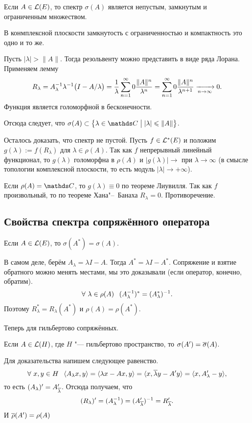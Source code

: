 \begin{Sl}
  Если $A\in \mathcal L(E)$, то спектр $\sigma(A)$ является непустым, замкнутым и ограниченным множеством.
\end{Sl}
В конмплексной плоскости замкнутость с ограниченностью и компактность это одно и то же.
\begin{Proof}
 Пусть $|\lambda|>\|A\|$. Тогда резольвенту можно представить в виде ряда Лорана. Применяем лемму
\[
  R_\lambda = A_\lambda^{-1}\lambda^{-1}\big(I-A/\lambda\big) = \frac1\lambda \sum\limits_{{n}={1}}^\infty0\frac{\|A\|^n}{\lambda^n} = 
  \sum\limits_{{n}={1}}^\infty0\frac{\|A\|^n}{\lambda^{n+1}}\xrightarrow[n\rightarrow\infty]{}0.
\]
Функция является голоморфной в бесконечности.

Отсюда следует, что $\sigma(A)\subset \big\{\lambda\in \C\bigm| |\lambda|\le \|A\|\big\}$.

Осталось доказать, что спектр не пустой. Пусть $f\in\mathcal L^*(E)$ и положим $g(\lambda):=f(R_\lambda)$ для $\lambda\in \rho(A)$. Так как $f$ непрерывный линейный функционал, то $g(\lambda)$ голоморфна в $\rho(A)$ и $\big|g(\lambda)\big|\to$ при $\lambda\to\infty$ (в смысле топологии комплексной плоскости, то есть модуль $|\lambda|\to+\infty$).

Если $\rho(A) = \C$, то $g(\lambda)\equiv 0$ по теореме Лиувилля. Так как $f$ произвольный, то по теореме Хана"--~Банаха $R_\lambda=0$. Противоречение.
\end{Proof}

\subsection{Свойства спектра сопряжённого оператора}
\begin{Ut}
  Если $A\in\mathcal L(E)$, то $\sigma(A^*) = \sigma(A)$. 
\end{Ut}
\begin{Proof}
В самом деле, берём $A_\lambda = \lambda I - A$. Тогда $A^* = \lambda I - A^*$. Сопряжение и взятие обратного можно менять местами, мы это доказывали (если оператор, конечно, обратим).
\[
  \forall\ \lambda\in \rho(A)\pau (
  A^{-1}_\lambda)^*
  = 
  (A^{*}_\lambda)^{-1}.
\]
Поэтому $R^*_\lambda = R_\lambda(A^*)$ и $\rho(A) = \rho(A^*)$.
\end{Proof}

Теперь для гильбертово сопряжённых.
\begin{Ut}
  Если $A\in \mathcal L(H)$, где $H$ "--- гильбертово пространство, то $\sigma(A') = \overline{\sigma}(A)$.
\end{Ut}
\begin{Proof}
Для доказательства напишем следующее равенство.
\[
  \forall\ x,y\in H\hskip .75em plus.1em minus.08em\relax 
   \langle A_\lambda x,y\rangle = \langle \lambda x - A x,y\rangle = 
   \langle x,\overline{\lambda} y - A' y\rangle = 
   \langle x,A'_\lambda - y\rangle,
\]
то есть $(A_\lambda)' = A'_{\overline{\lambda}}$. Отсюда получаем, что 
\[
  (R_\lambda)' = (A^{-1}_\lambda) = 
  (A'_{\overline{\lambda}})^{-1} = R'_{\overline{\lambda}}.
\]
И $\overline{\rho}(A') = \rho(A)$
\end{Proof}

